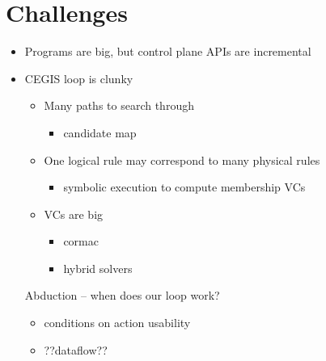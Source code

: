 




  
\section{Challenges}
\begin{itemize}
\item Programs are big, but control plane APIs are incremental
\item CEGIS loop is clunky
  \begin{itemize}
  \item Many paths to search through
    \begin{itemize} \item candidate map \end{itemize}
  \item One logical rule may correspond to many physical rules
    \begin{itemize} \item symbolic execution to compute membership VCs \end{itemize}
  \item VCs are big
    \begin{itemize}
    \item cormac
    \item hybrid solvers
    \end{itemize}
  \end{itemize}
Abduction -- when does our loop work?
  \begin{itemize}
  \item conditions on action usability
  \item ??dataflow??
  \end{itemize}
\end{itemize}

